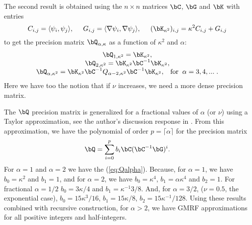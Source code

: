 The second result is obtained using the $n\times n$ matrices 
$\bC$, $\bG$ and $\bK$ with entries 
\begin{equation}
C_{i,j} = \langle \psi_i, \psi_j\rangle, \;\;\;\;\;
G_{i,j} = \langle \nabla \psi_i, \nabla \psi_j \rangle, \;\;\;\;\;
(\bK_{\kappa^2})_{i,j} = \kappa^2 C_{i,j} + G_{i,j}
\end{equation}
to get the precision matrix $\bQ_{\alpha,\kappa}$ 
as a function of $\kappa^2$ and $\alpha$: 
\begin{equation}\label{eq:Qalpha}\begin{array}{c}
\bQ_{1,\kappa^2} = \bK_{\kappa^2}, \\
\bQ_{2,\kappa^2} = \bK_{\kappa^2}\bC^{-1}\bK_{\kappa^2}, \\
\bQ_{\alpha,\kappa^2} = \bK_{\kappa^2}\bC^{-1}Q_{\alpha-2,\kappa^2}\bC^{-1}\bK_{\kappa^2}, 
\;\;\;\mbox{for} \;\;\alpha = 3,4,...\;.
\end{array}\end{equation}
Here we have too the notion that if $\nu$ increases, 
we need a more dense precision matrix. 

The $\bQ$ precision matrix is generalized for a fractional values 
of $\alpha$ (or $\nu$) using a Taylor approximation, 
see the author's discussion response in \cite{lindgrenRL:2011}. 
From this approximation, we have the polynomial of 
order $p=\lceil \alpha \rceil$ for the precision matrix 
\begin{equation}\label{eq:Qfrac}
\bQ = \sum_{i=0}^p b_i \bC(\bC^{-1}\bG)^i.
\end{equation}
For $\alpha=1$ and $\alpha=2$ we have the (\ref{eq:Qalpha}). 
Because, for $\alpha=1$, we have $b_0=\kappa^2$ and $b_1=1$, 
and for $\alpha=2$, we have $b_0=\kappa^4$, 
$b_1=\alpha\kappa^4$ and $b_2=1$. 
For fractional $\alpha=1/2$ 
$b_0=3\kappa/4$ and $b_1=\kappa^{-1}3/8$. 
And, for $\alpha=3/2$, ($\nu=0.5$, the exponential case), 
$b_0=15\kappa^3/16$, $b_1=15\kappa/8$, 
$b_2=15\kappa^{-1}/128$. 
Using these results combined with recursive construction, 
for $\alpha>2$, we have GMRF approximations for all positive 
integers and half-integers. 

